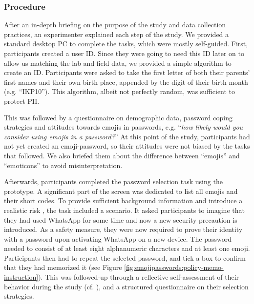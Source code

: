\subsubsection{Procedure}
After an in-depth briefing on the purpose of the study and data collection practices, an experimenter explained each step of the study. We provided a standard desktop PC to complete the tasks, which were mostly self-guided. First, participants created a user ID. 
Since they were going to need this ID later on to allow us matching the lab and field data, we provided a simple algorithm to create an ID. Participants were asked to take the first letter of both their parents' first names and their own birth place, appended by the digit of their birth month (e.g. ``IKP10''). This algorithm, albeit not perfectly random, was sufficient to protect \acrlong{PII}.

This was followed by a questionnaire on demographic data, password coping strategies and attitudes towards emojis in passwords, e.g. ``\textit{how likely would you consider using emojis in a password?}'' At this point of the study, participants had not yet created an emoji-password, so their attitudes were not biased by the tasks that followed. 
We also briefed them about the difference between ``emojis'' and ``emoticons'' to avoid misinterpretation. 

Afterwards, participants completed the password selection task using the prototype. A significant part of the screen was dedicated to list all emojis and their short codes. To provide sufficient background information and introduce a realistic risk \cite{Krol2016ExperimentDesign}, the task included a scenario. It asked participants to imagine that they had used WhatsApp for some time and now a new security precaution is introduced. As a safety measure, they were now required to prove their identity with a password upon activating WhatsApp on a new device. The password needed to consist of at least eight alphanumeric characters and at least one emoji. 
Participants then had to repeat the selected password, and tick a box to confirm that they had memorized it (see Figure \ref{fig:emojipasswords:policy-memo-instruction}). 
This was followed-up through a reflective self-assessment of their behavior during the study (cf. \cite{Fahl2013EcologicalValidityPasswordStudy}), and a structured questionnaire on their selection strategies. 

